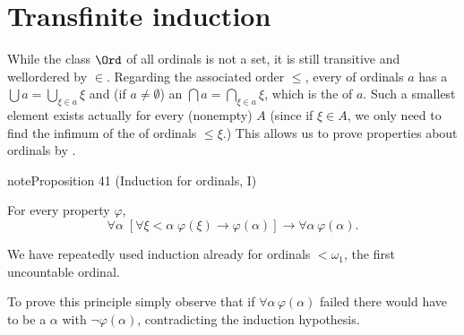 \documentclass[letterpaper,10pt,english]{jupyterBook}
\begin{document}
\section{Transfinite induction}
\label{\detokenize{recursion:transfinite-induction}}
\sphinxAtStartPar
While the class \(\Ord\) of all ordinals is not a set, it is still transitive and well\sphinxhyphen{}ordered by \(\in\). Regarding the associated order \(\leq\), every  of ordinals \(a\) has a  \(\bigcup a = \bigcup_{\xi \in a} \xi\) and (if \(a \ne \emptyset\)) an 
\(\bigcap a = \bigcap_{\xi \in a} \xi\), which is the  of \(a\). Such a smallest element exists actually for every (non\sphinxhyphen{}empty)  \(A\) (since if \(\xi \in A\), we only need to find the infimum of the  of ordinals \(\le \xi\).)
This allows us to prove properties about  ordinals by .
\label{recursion:prop-induction-ord-i}
\begin{sphinxadmonition}{note}{Proposition 41 (Induction for ordinals, I)}



\sphinxAtStartPar
For every property \(\varphi\),
\begin{equation*}
    \forall \alpha \; [ \forall \xi < \alpha \; \varphi(\xi) \to \varphi(\alpha)] \to \forall \alpha \, \varphi(\alpha).
\end{equation*}\end{sphinxadmonition}

\sphinxAtStartPar
We have repeatedly used induction already for ordinals \(< \omega_1\), the first uncountable ordinal.

\sphinxAtStartPar
To prove this principle simply observe that if \(\forall \alpha \, \varphi(\alpha)\) failed there would have to be a   \(\alpha\) with  \(\neg \varphi(\alpha)\), contradicting the induction hypothesis.
\end{document}
